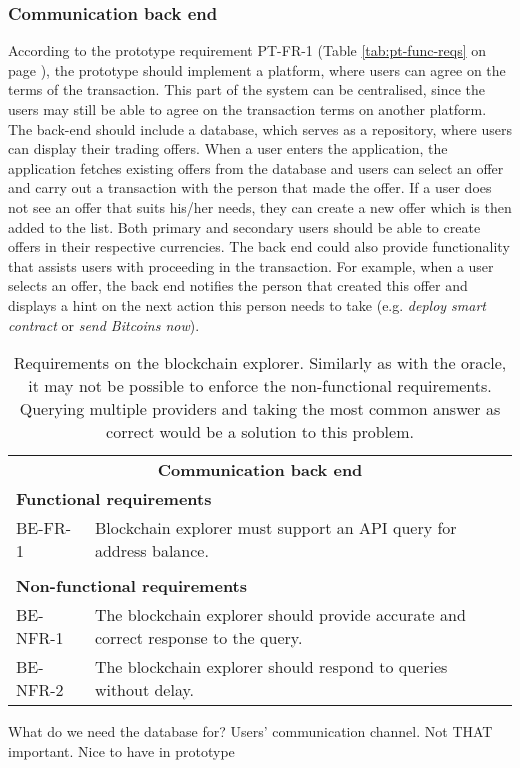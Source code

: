 \subsubsection{Communication back end}
According to the prototype requirement PT-FR-1 (Table \ref{tab:pt-func-reqs} on page \pageref{tab:pt-func-reqs}), the prototype should implement a platform, where users can agree on the terms of the transaction. This part of the system can be centralised, since the users may still be able to agree on the transaction terms on another platform. The back-end should include a database, which serves as a repository, where users can display their trading offers. When a user enters the application, the application fetches existing offers from the database and users can select an offer and carry out a transaction with the person that made the offer. If a user does not see an offer that suits his/her needs, they can create a new offer which is then added to the list. Both primary and secondary users should be able to create offers in their respective currencies. The back end could also provide functionality that assists users with proceeding in the transaction. For example, when a user selects an offer, the back end notifies the person that created this offer and displays a hint on the next action this person needs to take (e.g. \textit{deploy smart contract} or \textit{send Bitcoins now}).

\begin{table}[ht]
    \centering
    \begin{tabularx}{\textwidth}{|l X|}
    \hline
        \multicolumn{2}{|c|}{\textbf{Communication back end}}\\
        \multicolumn{2}{|l|}{\textbf{Functional requirements}}\\
        BE-FR-1&Blockchain explorer must support an API query for address balance.\\
        &\\
        \multicolumn{2}{|l|}{\textbf{Non-functional requirements}}\\
        BE-NFR-1&The blockchain explorer should provide accurate and correct response to the query.\\
        BE-NFR-2&The blockchain explorer should respond to queries without delay.\\
    \hline
    \end{tabularx}
    \caption{Requirements on the blockchain explorer. Similarly as with the oracle, it may not be possible to enforce the non-functional requirements. Querying multiple providers and taking the most common answer as correct would be a solution to this problem.}
    \label{tab:reqs-block-explorer}
\end{table}

What do we need the database for? Users' communication channel. Not THAT important. Nice to have in prototype